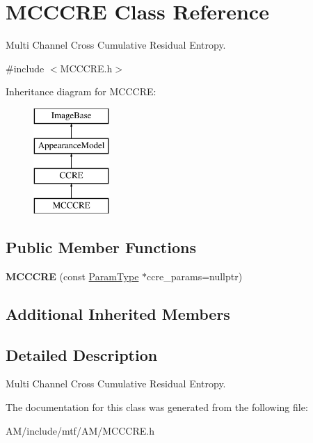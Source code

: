\hypertarget{classMCCCRE}{\section{M\-C\-C\-C\-R\-E Class Reference}
\label{classMCCCRE}
}


Multi Channel Cross Cumulative Residual Entropy.  




{\ttfamily \#include $<$M\-C\-C\-C\-R\-E.\-h$>$}

Inheritance diagram for M\-C\-C\-C\-R\-E\-:\begin{figure}[H]
\begin{center}
\leavevmode
\includegraphics[height=4.000000cm]{classMCCCRE}
\end{center}
\end{figure}
\subsection*{Public Member Functions}
\begin{DoxyCompactItemize}
\item 
\hypertarget{classMCCCRE_a3df4e6f9e602b3cf90331975882e9001}{{\bfseries M\-C\-C\-C\-R\-E} (const \hyperlink{structCCREParams}{Param\-Type} $\ast$ccre\-\_\-params=nullptr)}\label{classMCCCRE_a3df4e6f9e602b3cf90331975882e9001}

\end{DoxyCompactItemize}
\subsection*{Additional Inherited Members}


\subsection{Detailed Description}
Multi Channel Cross Cumulative Residual Entropy. 

The documentation for this class was generated from the following file\-:\begin{DoxyCompactItemize}
\item 
A\-M/include/mtf/\-A\-M/M\-C\-C\-C\-R\-E.\-h\end{DoxyCompactItemize}
